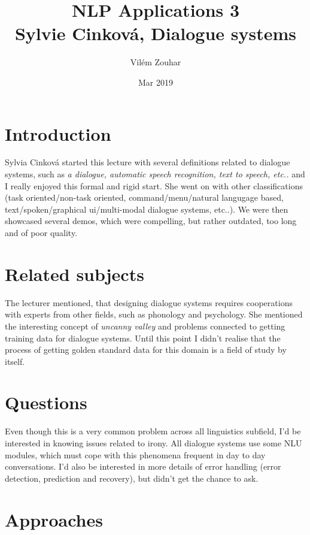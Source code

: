 \documentclass[a4paper]{article}
\begin{document}
\title{NLP Applications 3\\Sylvie Cinková, Dialogue systems}
\author{Vilém Zouhar}
\date{Mar 2019}
\maketitle 

\section*{Introduction}

Sylvia Cinková started this lecture with several definitions related to dialogue systems, such as \textit{a dialogue, automatic speech recognition, text to speech, etc..} and I really enjoyed this formal and rigid start. She went on with other classifications (task oriented/non-task oriented, command/menu/natural langugage based, text/spoken/graphical ui/multi-modal dialogue systems, etc..). We were then showcased several demos, which were compelling, but rather outdated, too long and of poor quality.

\section*{Related subjects}

The lecturer mentioned, that designing dialogue systems requires cooperations with experts from other fields, such as phonology and psychology. She mentioned the interesting concept of \textit{uncanny valley} and problems connected to getting training data for dialogue systems. Until this point I didn't realise that the process of getting golden standard data for this domain is a field of study by itself.

\section*{Questions}

Even though this is a very common problem across all linguistics subfield, I'd be interested in knowing issues related to irony. All dialogue systems use some NLU modules, which must cope with this phenomena frequent in day to day conversations. I'd also be interested in more details of error handling (error detection, prediction and recovery), but didn't get the chance to ask.

\section*{Approaches}
\end{document}
